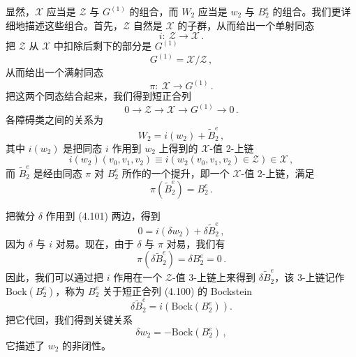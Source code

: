 显然，$\mathcal{X}$ 应当是 $\mathcal{Z}$ 与 $G^{(1)}$ 的组合，而 $W_2$ 应当是 $w_2$ 与 $B_2^e$ 的组合。我们更详细地描述这些组合。首先，$\mathcal{Z}$ 自然是 $\mathcal{X}$ 的子群，从而给出一个单射同态
\begin{equation}
i:\ \mathcal{Z}\to\mathcal{X}\,.
\tag{4.97}
\end{equation}
把 $\mathcal{Z}$ 从 $\mathcal{X}$ 中扣除后剩下的部分是 $G^{(1)}$
\begin{equation}
G^{(1)}=\mathcal{X}/\mathcal{Z}\,,
\tag{4.98}
\end{equation}
从而给出一个满射同态
\begin{equation}
\pi:\ \mathcal{X}\to G^{(1)}\,.
\tag{4.99}
\end{equation}
把这两个同态结合起来，我们得到短正合列
\begin{equation}
0\to\mathcal{Z}\to\mathcal{X}\to G^{(1)}\to 0\,.
\tag{4.100}
\end{equation}
各障碍类之间的关系为
\begin{equation}
W_2=i(w_2)+\tilde{B}_2^e\,,
\tag{4.101}
\end{equation}
其中 $i(w_2)$ 是把同态 $i$ 作用到 $w_2$ 上得到的 $\mathcal{X}$-值 2-上链
\begin{equation}
i(w_2)(v_0,v_1,v_2)\equiv i\left(w_2(v_0,v_1,v_2)\in\mathcal{Z}\right)\in\mathcal{X}\,,
\tag{4.102}
\end{equation}
而 $\tilde{B}_2^e$ 是经由同态 $\pi$ 对 $B_2^e$ 所作的一个提升，即一个 $\mathcal{X}$-值 2-上链，满足
\begin{equation}
\pi(\tilde{B}_2^e)=B_2^e\,.
\tag{4.103}
\end{equation}

把微分 $\delta$ 作用到 (4.101) 两边，得到
\begin{equation}
0=i(\delta w_2)+\delta\tilde{B}_2^e\,,
\tag{4.104}
\end{equation}
因为 $\delta$ 与 $i$ 对易。现在，由于 $\delta$ 与 $\pi$ 对易，我们有
\begin{equation}
\pi(\delta\tilde{B}_2^e)=\delta B_2^e=0\,.
\tag{4.105}
\end{equation}
因此，我们可以通过把 $i$ 作用在一个 $\mathcal{Z}$-值 3-上链上来得到 $\delta\tilde{B}_2^e$，该 3-上链记作 $\mathrm{Bock}(B_2^e)$，称为 $B_2^e$ 关于短正合列 (4.100) 的 Bockstein
\begin{equation}
\delta\tilde{B}_2^e=i\left(\mathrm{Bock}(B_2^e)\right).
\tag{4.106}
\end{equation}
把它代回，我们得到关键关系
\begin{equation}
\delta w_2=-\mathrm{Bock}(B_2^e)\,,
\tag{4.107}
\end{equation}
它描述了 $w_2$ 的非闭性。

